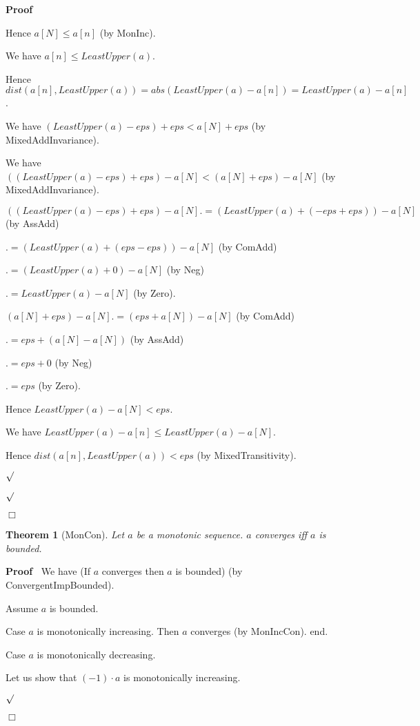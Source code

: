 \documentclass{article}
\newenvironment{forthel}{\begin{leftbar}}{\end{leftbar}}
\newenvironment{proof}{\noindent\textbf{Proof\ }}{\hspace*{\fill}$\Box$\medskip}
\newenvironment{subproof}{\begin{list}{}{}
		\item[\text{Proof}]}{\hfill $\surd$ \end{list}}
\newtheorem{theorem}{Theorem}
\newcommand{\cdottwo}{\cdot}
\begin{document}
\begin{forthel}
\begin{proof}
\begin{subproof}
\begin{subproof}
				Hence $a[N] \leq a[n]$ (by MonInc).
				
				We have $a[n] \leq LeastUpper(a)$.
				
				Hence $dist(a[n],LeastUpper(a)) = abs(LeastUpper(a) - a[n]) = LeastUpper(a) - a[n]$.
				
				We have $(LeastUpper(a) - eps) + eps < a[N] + eps$ (by MixedAddInvariance).
				
				We have $((LeastUpper(a) - eps) + eps) - a[N] < (a[N] + eps) - a[N]$ (by MixedAddInvariance).
				
				$((LeastUpper(a) - eps) + eps) - a[N] .= (LeastUpper(a) + (-eps + eps)) - a[N]$ (by AssAdd)
				
				$.= (LeastUpper(a) + (eps - eps)) - a[N]$ (by ComAdd)
				
				$.= (LeastUpper(a) + 0) - a[N]$ (by Neg)
				
				$.= LeastUpper(a) - a[N]$ (by Zero).
				
				$(a[N] + eps) - a[N] .= (eps + a[N]) - a[N]$ (by ComAdd)
				
				$.= eps + (a[N] - a[N])$ (by AssAdd)
				
				$.= eps + 0$ (by Neg)
				
				$.= eps$ (by Zero).
				
				Hence $LeastUpper(a) - a[N] < eps$.
				
				We have $LeastUpper(a) - a[n] \leq LeastUpper(a) - a[N]$.
				
				Hence $dist(a[n],LeastUpper(a)) < eps$ (by MixedTransitivity).
				
			\end{subproof}
			
		\end{subproof}
	\end{proof}
	
	\begin{theorem}[MonCon]
		Let $a$ be a monotonic sequence. $a$ converges iff $a$ is bounded.
	\end{theorem}
	
	\begin{proof}
		We have (If $a$ converges then $a$ is bounded) (by ConvergentImpBounded).
		
		Assume $a$ is bounded.
		
		Case $a$ is monotonically increasing. Then $a$ converges (by MonIncCon). 
		end.
		
		Case $a$ is monotonically decreasing.
		
		\begin{subproof}
			Let us show that $(-1) \cdottwo a$ is monotonically increasing.
			

\end{subproof}
\end{proof}
\end{forthel}
\end{document}
